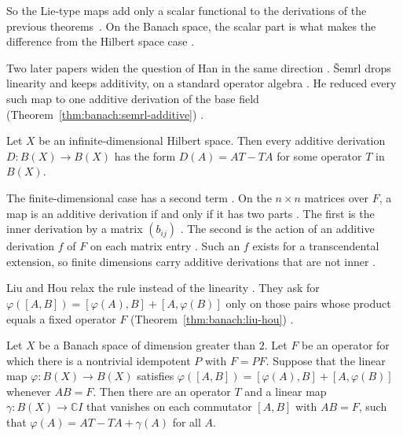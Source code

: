 So the Lie-type maps add only a scalar functional to the derivations of the
previous theorems~\cite[p.~6]{ZhangWei2017}. On the Banach space, the scalar part is what makes the
difference from the Hilbert space case
\cite[p.~6]{ZhangWei2017}.

Two later papers widen the question of Han in the same direction
\cite[pp.~234, 81]{Semrl1991Additive,LiuHou2025Lie}. \v{S}emrl drops linearity
and keeps additivity, on a standard operator algebra
\cite[p.~234]{Semrl1991Additive}. He reduced every such map to one additive
derivation of the base field (Theorem~\ref{thm:banach:semrl-additive})
\cite[p.~235]{Semrl1991Additive}.

\begin{theorem}\label{thm:banach:semrl-additive}
Let $X$ be an infinite-dimensional Hilbert space. Then every additive
derivation $D\colon B(X)\to B(X)$ has the form $D(A)=AT-TA$ for some operator
$T$ in $B(X)$.
\end{theorem}

The finite-dimensional case has a second term \cite[Theorem~2.2,
p.~236]{Semrl1991Additive}. On the $n\times n$ matrices over $F$, a map is an
additive derivation if and only if it has two parts \cite[Theorem~2.2,
p.~236]{Semrl1991Additive}. The first is the inner derivation by a matrix
$(b_{ij})$ \cite[Theorem~2.2, p.~236]{Semrl1991Additive}. The second is the
action of an additive derivation $f$ of $F$ on each matrix entry
\cite[Theorem~2.2, p.~236]{Semrl1991Additive}. Such an $f$ exists for a
transcendental extension, so finite dimensions carry additive derivations that
are not inner \cite[p.~235]{Semrl1991Additive}.

Liu and Hou relax the rule instead of the linearity
\cite[p.~81]{LiuHou2025Lie}. They ask for
$\varphi([A,B])=[\varphi(A),B]+[A,\varphi(B)]$ only on those pairs whose
product equals a fixed operator $F$ (Theorem~\ref{thm:banach:liu-hou})
\cite[p.~81]{LiuHou2025Lie}.

\begin{theorem}\label{thm:banach:liu-hou}
Let $X$ be a Banach space of dimension greater than $2$. Let $F$ be an
operator for which there is a nontrivial idempotent $P$ with $F=PF$. Suppose
that the linear map $\varphi\colon B(X)\to B(X)$ satisfies
$\varphi([A,B])=[\varphi(A),B]+[A,\varphi(B)]$ whenever $AB=F$. Then there are
an operator $T$ and a linear map $\gamma\colon B(X)\to\mathbb{C}I$ that
vanishes on each commutator $[A,B]$ with $AB=F$, such that
$\varphi(A)=AT-TA+\gamma(A)$ for all $A$.
\end{theorem}


